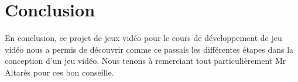 \section{Conclusion}
En conclusion, ce projet de jeux vidéo pour le cours de développement de jeu vidéo nous a permis de découvrir comme ce passais les différentes étapes dans la conception d'un jeu vidéo. 
Nous tenons à remerciant tout particulièrement Mr Altarès pour ces bon conseille.
